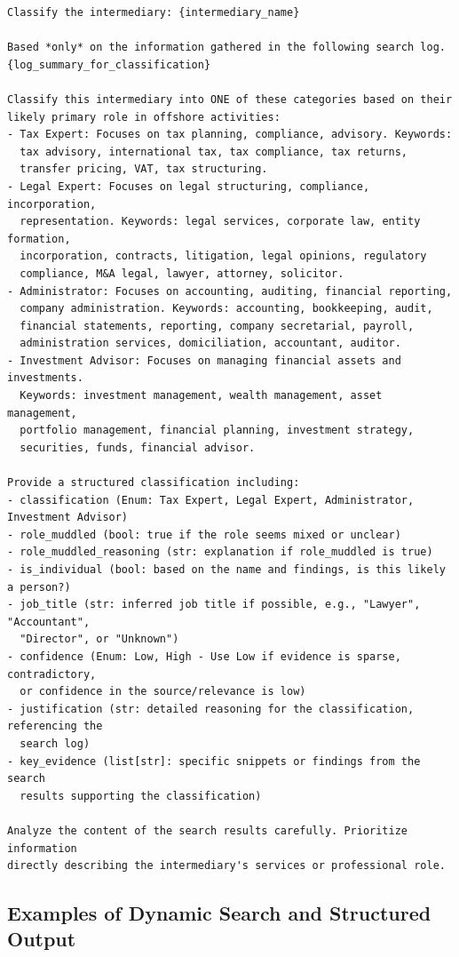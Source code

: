 \begin{verbatim}
Classify the intermediary: {intermediary_name}

Based *only* on the information gathered in the following search log.
{log_summary_for_classification}

Classify this intermediary into ONE of these categories based on their
likely primary role in offshore activities:
- Tax Expert: Focuses on tax planning, compliance, advisory. Keywords:
  tax advisory, international tax, tax compliance, tax returns,
  transfer pricing, VAT, tax structuring.
- Legal Expert: Focuses on legal structuring, compliance, incorporation,
  representation. Keywords: legal services, corporate law, entity formation,
  incorporation, contracts, litigation, legal opinions, regulatory
  compliance, M&A legal, lawyer, attorney, solicitor.
- Administrator: Focuses on accounting, auditing, financial reporting,
  company administration. Keywords: accounting, bookkeeping, audit,
  financial statements, reporting, company secretarial, payroll,
  administration services, domiciliation, accountant, auditor.
- Investment Advisor: Focuses on managing financial assets and investments.
  Keywords: investment management, wealth management, asset management,
  portfolio management, financial planning, investment strategy,
  securities, funds, financial advisor.

Provide a structured classification including:
- classification (Enum: Tax Expert, Legal Expert, Administrator, Investment Advisor)
- role_muddled (bool: true if the role seems mixed or unclear)
- role_muddled_reasoning (str: explanation if role_muddled is true)
- is_individual (bool: based on the name and findings, is this likely a person?)
- job_title (str: inferred job title if possible, e.g., "Lawyer", "Accountant",
  "Director", or "Unknown")
- confidence (Enum: Low, High - Use Low if evidence is sparse, contradictory,
  or confidence in the source/relevance is low)
- justification (str: detailed reasoning for the classification, referencing the
  search log)
- key_evidence (list[str]: specific snippets or findings from the search
  results supporting the classification)

Analyze the content of the search results carefully. Prioritize information
directly describing the intermediary's services or professional role.
\end{verbatim}

\subsection*{Examples of Dynamic Search and Structured Output}

